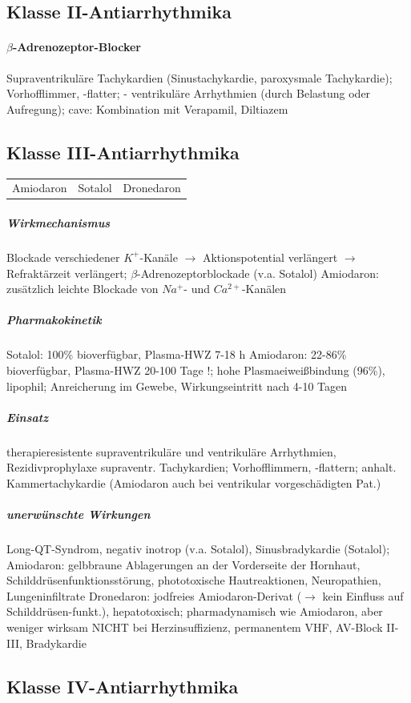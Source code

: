 \documentclass[10pt,a4paper]{report}
\begin{document}
\subsection{Klasse II-Antiarrhythmika}

\paragraph{$\beta$-Adrenozeptor-Blocker} Supraventrikuläre Tachykardien (Sinustachykardie, paroxysmale Tachykardie); Vorhofflimmer, -flatter; - ventrikuläre Arrhythmien (durch Belastung oder Aufregung); cave: Kombination mit Verapamil, Diltiazem

\subsection{Klasse III-Antiarrhythmika}

\begin{tabularx}{\textwidth}{XXX}
Amiodaron&Sotalol&Dronedaron\\
\end{tabularx}

\subparagraph{Wirkmechanismus} Blockade verschiedener $K^+$-Kanäle 	$\rightarrow$ Aktionspotential verlängert $\rightarrow$ Refraktärzeit verlängert; $\beta$-Adrenozeptorblockade (v.a. Sotalol)
Amiodaron: zusätzlich leichte Blockade von $Na^+$- und $Ca^{2+}$-Kanälen

\subparagraph{Pharmakokinetik} Sotalol: 100\% bioverfügbar, Plasma-HWZ 7-18 h
Amiodaron: 22-86\% bioverfügbar, Plasma-HWZ 20-100 Tage !;
hohe Plasmaeiweißbindung (96\%), lipophil; Anreicherung im Gewebe, Wirkungseintritt nach 4-10 Tagen

\subparagraph{Einsatz} therapieresistente supraventrikuläre und ventrikuläre Arrhythmien,
Rezidivprophylaxe supraventr. Tachykardien; Vorhofflimmern, -flattern; anhalt. Kammertachykardie (Amiodaron auch bei ventrikular vorgeschädigten Pat.)

\subparagraph{unerwünschte Wirkungen} Long-QT-Syndrom, negativ inotrop (v.a. Sotalol), Sinusbradykardie (Sotalol); Amiodaron: gelbbraune Ablagerungen an der Vorderseite der Hornhaut, Schilddrüsenfunktionsstörung, phototoxische Hautreaktionen, Neuropathien, Lungeninfiltrate
Dronedaron: jodfreies Amiodaron-Derivat ($\rightarrow$ kein Einfluss auf Schilddrüsen-funkt.), hepatotoxisch; pharmadynamisch wie Amiodaron, aber weniger wirksam
NICHT bei Herzinsuffizienz, permanentem VHF, AV-Block \degree II-III, Bradykardie

\subsection{Klasse IV-Antiarrhythmika}
\end{document}
